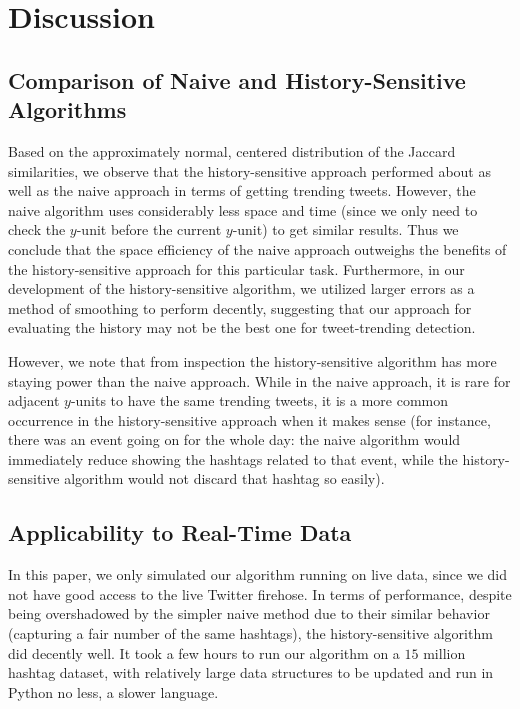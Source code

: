 \documentclass[twoside]{article}
\begin{document}
{%

\section{Discussion}

\subsection{Comparison of Naive and History-Sensitive Algorithms}

Based on the approximately normal, centered distribution of the Jaccard similarities, we observe that the history-sensitive approach performed about as well as the naive approach in terms of getting trending tweets. However, the naive algorithm uses considerably less space and time (since we only need to check the 
$y$-unit before the current $y$-unit) to get similar results. Thus we conclude that the space efficiency of the naive approach outweighs the benefits of the history-sensitive approach for this particular task.  Furthermore, in our development of the history-sensitive algorithm, we utilized larger errors as a method of smoothing to perform decently, suggesting that our approach for evaluating the history may not be the best one for tweet-trending detection. 

However, we note that from inspection the history-sensitive algorithm has more staying power than 
the naive approach. While in the naive approach, it is rare for adjacent $y$-units to have the same
trending tweets, it is a more common occurrence in the history-sensitive approach when it makes sense (for instance, there was an event going on for the whole day: the naive algorithm would immediately reduce showing the hashtags related to that event, while the history-sensitive algorithm would not discard that
hashtag so easily).

\subsection{Applicability to Real-Time Data}

In this paper, we only simulated our algorithm running on live data, since we did not 
have good access to the live Twitter firehose. In terms of performance, despite being overshadowed
by the simpler naive method due to their similar behavior (capturing a fair number of the same hashtags), 
the history-sensitive algorithm did decently well. It took a few hours to run our algorithm 
on a $15$ million hashtag dataset, with relatively large data structures to be updated and run in Python no less, a slower language.

}
\end{document}
